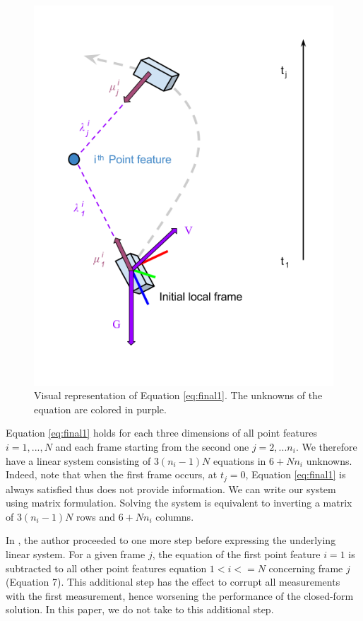 \documentclass[letterpaper, 10 pt, conference]{ieeeconf}  %
\begin{document}
\begin{figure}
  \centering
  \includegraphics[width=0.90\columnwidth]{images/closedFormExplained}
  \caption{Visual representation of Equation \ref{eq:final1}.
  The unknowns of the equation are colored in \textcolor{amethyst}{purple}.}
\end{figure}

Equation \ref{eq:final1} holds for each three dimensions of all point features $i=1,...,N$ and each frame starting from the second one $j=2,...n_i$.
We therefore have a linear system consisting of $3(n_i-1)N$ equations in $6 + Nn_i$ unknowns.
Indeed, note that when the first frame occurs, at $t_j = 0$,
Equation \ref{eq:final1} is always satisfied thus does not provide information.
We can write our system using matrix formulation.
Solving the system is equivalent to inverting a matrix of $3(n_i-1)N$ rows and $6+Nn_i$ columns.

In \cite{Martinelli2014}, the author proceeded to one more step before expressing the underlying linear system.
For a given frame $j$, the equation of the first point feature $i=1$ is subtracted to all other point features equation $1<i<=N$ concerning frame $j$ (Equation 7).
This additional step has the effect to corrupt all measurements with the first measurement,
hence worsening the performance of the closed-form solution.
In this paper, we do not take to this additional step.
\end{document}
